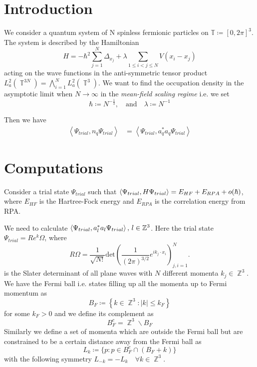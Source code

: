\documentclass[sn-mathphys,Numbered, a4paper ,nocrop]{sn-jnl}%
\DeclareMathOperator{\Z}{\mathbb{Z}}
\DeclareMathOperator{\T}{\mathbb{T}}
\newcommand{\eva}[1]{\left\langle #1 \right\rangle}
\theoremstyle{plain}
\theoremstyle{definition}
\theoremstyle{remark}
\theoremstyle{plain}
\theoremstyle{definition}
\theoremstyle{remark}
\begin{document}
\section{Introduction}\label{sec1}
We consider a quantum system of N spinless fermionic particles on $\mathbb{T}\coloneq [0,2\pi]^3$. The system is described by the Hamiltonian
\begin{equation}
    H = -\hbar^2\sum\limits_{j=1}^{N}\Delta_{x_j} + \lambda\!\!\!\sum\limits_{1\leq i < j \leq N } V(x_i - x_j)
\end{equation}
acting on the wave functions in the anti-symmetric tensor product $L^2_a(\T^{3N}) = \bigwedge_{i=1}^N L^2_a(\T^3)$.
We want to find the occupation density in the asymptotic limit when $N\rightarrow\infty$ in the \textit{mean-field scaling regime} i.e. we set
\begin{equation}
    \hbar\coloneq N^{-\frac{1}{3}}, \quad\text{and}\quad \lambda \coloneq N^{-1}
\end{equation}



Then we have
\begin{align}
    \eva{\Psi_{trial},n_q\Psi_{trial}} &= \eva{\Psi_{trial},a^*_qa_q\Psi_{trial}} 
\end{align}



\section{Computations}\label{sec2}

Consider a trial state $\Psi_{trial}$ such that $\braket{\Psi_{trial},H\Psi_{trial}} = E_{HF} + E_{RPA}+ o(\hbar) $, where $E_{HF}$ is the Hartree-Fock energy and $E_{RPA}$ is the correlation energy from RPA.

We need to calculate $\braket{\Psi_{trial},a^*_la_l\Psi_{trial}},\, l\in\mathbb{Z}^3$. Here the trial state $\Psi_{trial}= Re^k\Omega$, where 
\begin{equation}
    R\Omega = \frac{1}{\sqrt{N!}}\text{det}\left(\frac{1}{(2\pi)^{3/2}}e^{ik_j\cdot x_i}\right)^N_{j,i=1}.
\end{equation}
is the Slater determinant of all plane waves with $N$ different momenta $k_j \in \Z^3$.
We have the Fermi ball i.e. states filling up all the momenta up to Fermi momentum as
\begin{equation}
    B_F\coloneq\left\{k\in \Z^3 : |k|\leq k_F\right\}
\end{equation}
for some $k_F>0$ and we define its complement as 
\begin{equation}
    B_F^c=\Z^3\backslash B_F
\end{equation}
Similarly we define a set of momenta which are outside the Fermi ball but are constrained to be a certain distance away from the Fermi ball as 
\begin{equation}
    L_k\coloneq \{p :p\in B_F^c \cap (B_F + k)\}
\end{equation}
with the following symmetry $L_{-k}=-L_k \quad\forall k \in \Z^3$.
\end{document}
